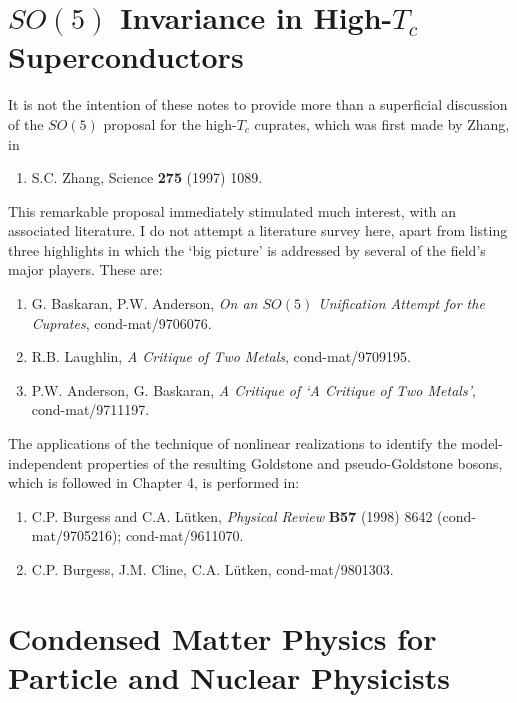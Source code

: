 \documentclass[12pt]{report}
\begin{document}
\section{$SO(5)$ Invariance in High-$T_c$ Superconductors}

It is not the intention of these notes to provide more than
a superficial discussion of the $SO(5)$ proposal for the
high-$T_c$ cuprates, which was first made by Zhang, in

\begin{enumerate}
\item
S.C. Zhang, Science {\bf 275} (1997) 1089.
\end{enumerate}

\bigskip\noindent
This remarkable proposal immediately stimulated much
interest, with an associated literature. I do not attempt a
literature survey here, apart from listing three highlights
in which the `big picture' is addressed by several of the
field's major players. These are:

\begin{enumerate}

\item
 G. Baskaran, P.W. Anderson, {\sl On an $SO(5)$ Unification
Attempt for the Cuprates}, cond-mat/9706076.

\item
R.B. Laughlin, {\sl A Critique of Two Metals},
cond-mat/9709195.

\item
P.W. Anderson, G. Baskaran, {\sl A Critique of `A Critique
of Two Metals'}, cond-mat/9711197.

\end{enumerate}


\bigskip
The applications of the technique of nonlinear realizations
to identify the model-independent properties of the
resulting Goldstone and pseudo-Goldstone bosons, which is
followed in Chapter 4, is performed in:

\begin{enumerate}
\item
C.P. Burgess and C.A. L\"utken, {\it Physical Review} {\bf
B57} (1998) 8642 (cond-mat/9705216);  cond-mat/9611070.

\item
C.P. Burgess, J.M. Cline, C.A. L\"utken, cond-mat/9801303.

\end{enumerate}


\section{Condensed Matter Physics for Particle and Nuclear
Physicists}
\end{document}
